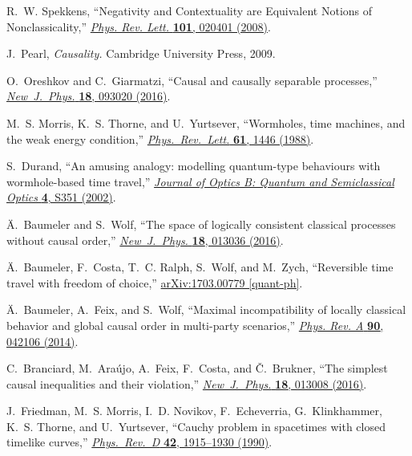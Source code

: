 \documentclass[a4paper,onecolumn,11pt,accepted=2018-05-04]{quantumarticle}
\begin{document}
\begin{thebibliography}{10}
R.~W. {Spekkens}, ``{Negativity and Contextuality are Equivalent Notions of
  Nonclassicality},''
  \href{http://dx.doi.org/10.1103/PhysRevLett.101.020401}{{\em Phys. Rev.
  Lett.} {\bfseries 101}, 020401 (2008)}.

J.~Pearl, {\em Causality.}
\newblock Cambridge University Press, 2009.

O.~Oreshkov and C.~Giarmatzi, ``Causal and causally separable processes,''
  \href{http://dx.doi.org/10.1088/1367-2630/18/9/093020}{{\em New\ J.\ Phys.}
  {\bfseries 18}, 093020 (2016)}.

M.~S. Morris, K.~S. Thorne, and U.~Yurtsever, ``Wormholes, time machines, and
  the weak energy condition,''
  \href{https://doi.org/10.1103/PhysRevLett.61.1446}{{\em Phys.\
  Rev.\ Lett.} {\bfseries 61}, 1446 (1988)}.

S.~Durand, ``An amusing analogy: modelling quantum-type behaviours with
  wormhole-based time travel,''
  \href{http://dx.doi.org/10.1088/1464-4266/4/4/319}{{\em Journal of Optics B:
  Quantum and Semiclassical Optics} {\bfseries 4}, S351 (2002)}.

{\"{A}}.~Baumeler and S.~Wolf, ``{The space of logically consistent classical
  processes without causal order},''
  \href{http://dx.doi.org/10.1088/1367-2630/18/1/013036}{{\em New\ J.\ Phys.}
  {\bfseries 18}, 013036 (2016)}.

{\"A}.~Baumeler, F.~Costa, T.~C. Ralph, S.~Wolf, and M.~Zych, ``Reversible time
  travel with freedom of choice,''
  \href{http://arxiv.org/abs/1703.00779}{{\ttfamily arXiv:1703.00779
  [quant-ph]}}.

{\"A}.~Baumeler, A.~Feix, and S.~Wolf, ``{Maximal incompatibility of locally
  classical behavior and global causal order in multi-party scenarios},''
  \href{http://dx.doi.org/10.1103/PhysRevA.90.042106}{{\em Phys. Rev. A}
  {\bfseries 90}, 042106 (2014)}.

C.~Branciard, M.~Araújo, A.~Feix, F.~Costa, and {\v C}.~Brukner, ``The
  simplest causal inequalities and their violation,''
  \href{http://dx.doi.org/10.1088/1367-2630/18/1/013008}{{\em New\ J.\ Phys.}
  {\bfseries 18}, 013008 (2016)}.

J.~Friedman, M.~S. Morris, I.~D. Novikov, F.~Echeverria, G.~Klinkhammer, K.~S.
  Thorne, and U.~Yurtsever, ``{Cauchy problem in spacetimes with closed
  timelike curves},'' \href{http://dx.doi.org/10.1103/PhysRevD.42.1915}{{\em
  Phys.\ Rev.\ D} {\bfseries 42}, 1915--1930 (1990)}.


\end{thebibliography}
\end{document}
